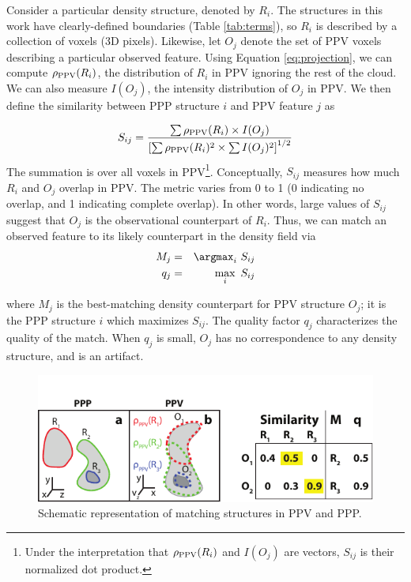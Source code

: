 Consider a particular density structure, denoted by $R_i$. The structures in this work have clearly-defined boundaries (Table \ref{tab:terms}), so $R_i$ is described by a collection of voxels (3D pixels). Likewise, let $O_j$ denote the set of PPV voxels describing a particular observed feature. Using Equation \ref{eq:projection}, we can compute $\rho_{\rm PPV}(R_i)$, the distribution of $R_i$ in PPV ignoring the rest of the cloud. We can also measure $I(O_j)$, the intensity distribution of $O_j$ in PPV. We then define the similarity between PPP structure $i$ and PPV feature $j$ as

\begin{equation}
S_{ij} = \frac{\sum \rho_{\rm PPV}(R_i) \times I(O_j)}{\left[\sum \rho_{\rm PPV}(R_i)^2 \times \sum I(O_j)^2\right]^{1/2}}
\label{eq:sim}
\end{equation}
The summation is over all voxels in PPV\footnote{Under the interpretation that $\rho_{\rm PPV}(R_i)$ and $I(O_j)$ are vectors, $S_{ij}$ is their normalized dot product.}. Conceptually, $S_{ij}$ measures how much $R_i$ and $O_j$ overlap in PPV. The metric varies from 0 to 1 (0 indicating no overlap, and 1 indicating complete overlap).  In other words, large values of $S_{ij}$ suggest that $O_j$ is the observational counterpart of $R_i$. Thus, we can match an observed feature to its likely counterpart in the density field via
 \begin{eqnarray}
  \label{eq:match}
 M_j &=& \argmax_{i}~ S_{ij}   \\
 q_j &=& \max_{i} ~S_{ij}
 \label{eq:quality}
 \end{eqnarray}

where $M_j$ is the best-matching density counterpart for PPV structure $O_j$; it is the PPP structure $i$ which maximizes $S_{ij}$. The quality factor $q_j$ characterizes the quality of the match. When $q_j$ is small, $O_j$ has no correspondence to any density structure, and is an artifact.

\begin{figure}[hbp!]
\centering
\includegraphics[width=5in]{figures/match}
\caption{Schematic representation of matching structures in PPV and PPP.}
\label{fig:match_schematic}
\end{figure}

